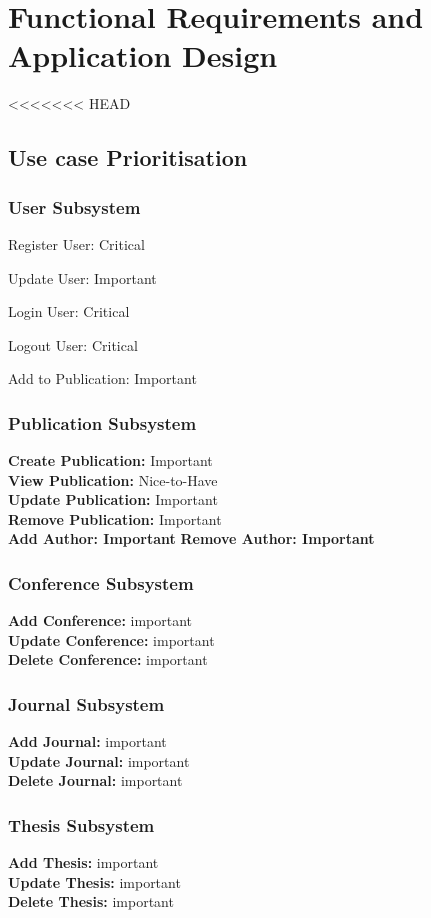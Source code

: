 \documentclass{article}
\begin{document}
	\section{Functional Requirements and Application Design}
<<<<<<< HEAD
		\subsection{Use case Prioritisation}
			\subsubsection{User Subsystem}
				Register User: Critical\par
				Update User: Important\par
				Login User: Critical\par
				Logout User: Critical\par
				Add to Publication: Important
			\subsubsection{Publication Subsystem}
			\textbf{Create Publication:} Important\\
			\textbf{View Publication:} Nice-to-Have\\
			\textbf{Update Publication:} Important\\
			\textbf{Remove Publication:} Important\\
			\textbf{Add Author: Important}
			\textbf{Remove Author: Important}
			\subsubsection{Conference Subsystem}
				\textbf{Add Conference:} important\\
				\textbf{Update Conference:} important\\
				\textbf{Delete Conference:} important
			\subsubsection{Journal Subsystem}
				\textbf{Add Journal:} important\\
				\textbf{Update Journal:} important\\
				\textbf{Delete Journal:} important
			\subsubsection{Thesis Subsystem}
				\textbf{Add Thesis:} important\\
				\textbf{Update Thesis:} important\\
				\textbf{Delete Thesis:} important
\end{document}
